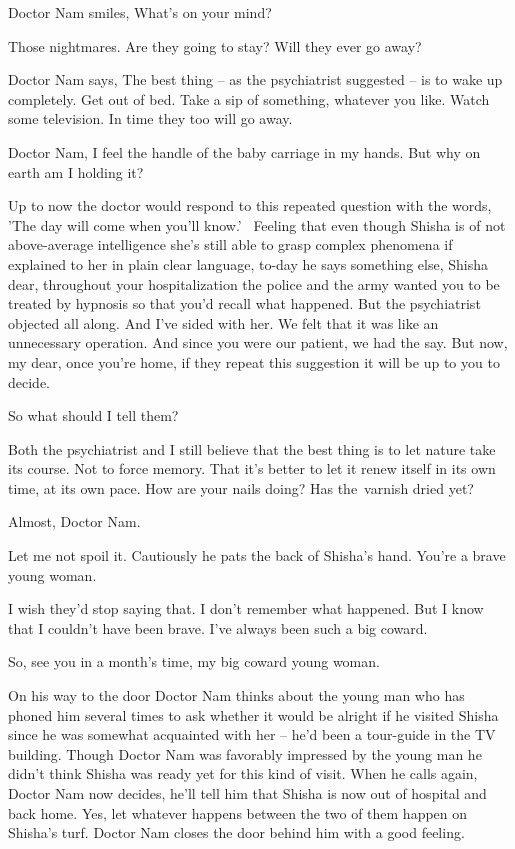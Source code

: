 \documentclass[letterpaper]{article}
\begin{document}
Doctor Nam smiles, {\textquotedbl}What's on your mind?{\textquotedbl} 

{\textquotedbl}Those nightmares. Are they going to stay? Will they ever go away?{\textquotedbl} 

Doctor Nam says, {\textquotedbl}The best thing -- as the psychiatrist suggested -- is to wake up completely. Get out of
bed. Take a sip of something,{ }whatever you like. Watch some television. In
time they too will go away.{\textquotedbl}

{\textquotedbl}Doctor Nam, I feel the handle of the baby carriage in my hands. But why on earth am I holding
it?{\textquotedbl} 

Up to now the doctor would respond to this repeated question with the words, 'The day will come when you'll know.'
~Feeling that even though Shisha is of not above{{}-}average intelligence she's
still able to grasp complex phenomena if explained to her in plain clear language, to-day he says something else,
{\textquotedbl}Shisha dear, throughout your hospitalization the police and the army wanted you to be treated by
hypnosis so that you'd recall what happened. But the psychiatrist objected all along. And I've sided with her. We felt
that it was like an unnecessary operation. And since you were our patient, we had the say. But now, my dear, once
you're home, if they repeat this suggestion it will be up to you to decide.{\textquotedbl} 

{\textquotedbl}So what should I tell them?{\textquotedbl} 

{\textquotedbl}Both the psychiatrist and I still believe that the best thing is to let nature take its course. Not to
force memory. That it's better to let it renew itself in its own time, at its own pace. How are your nails doing? Has
the~varnish dried yet?{\textquotedbl} 

{\textquotedbl}Almost, Doctor Nam.{\textquotedbl} 

{\textquotedbl}Let me not spoil it.{\textquotedbl} Cautiously he pats the back of Shisha's hand. {\textquotedbl}You're a
brave young woman.{\textquotedbl} 

{\textquotedbl}I wish they'd stop saying that. I don't remember what happened. But I know that I couldn't have been
brave. I've always been such a big coward.{\textquotedbl} 

{\textquotedbl}So, see you in a month's time, my big coward young woman.{\textquotedbl}

On his way to the door Doctor Nam thinks about the young man who has phoned him several times to ask whether it would be
alright if he visited Shisha since he was somewhat acquainted with her -- he'd been a tour-guide in the TV building.
Though Doctor Nam was favorably impressed by the young man he didn't think Shisha was ready yet for this kind of visit.
When he calls again, Doctor Nam now decides, he'll tell him that Shisha is now out of hospital and back home. Yes, let
whatever happens between the two of them happen on Shisha's turf. Doctor Nam closes the door behind him with a good
feeling.
\end{document}

